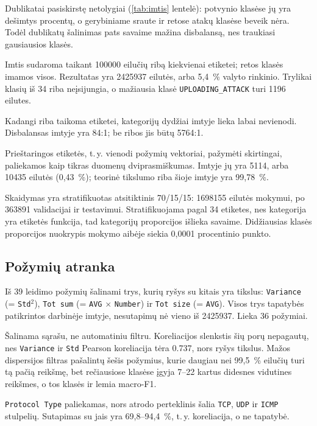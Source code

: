 Dublikatai pasiskirstę netolygiai (\ref{tab:imtis} lentelė): potvynio
klasėse jų yra dešimtys procentų, o gerybiniame sraute ir retose atakų
klasėse beveik nėra. Todėl dublikatų šalinimas pats savaime mažina
disbalansą, nes traukiasi gausiausios klasės.

Imtis sudaroma taikant \num{100000} eilučių ribą kiekvienai etiketei;
retos klasės imamos visos. Rezultatas yra \num{2425937} eilutės, arba
5,4~\% valyto rinkinio. Trylikai klasių iš 34 riba neįsijungia, o
mažiausia klasė \texttt{UPLOADING\_ATTACK} turi \num{1196} eilutes.

Kadangi riba taikoma etiketei, kategorijų dydžiai imtyje lieka labai
nevienodi. Disbalansas imtyje yra 84:1; be ribos jis būtų 5764:1.

Prieštaringos etiketės, t.\,y. vienodi požymių vektoriai, pažymėti
skirtingai, paliekamos kaip tikras duomenų dviprasmiškumas. Imtyje jų yra
\num{5114}, arba \num{10435} eilutės (0,43~\%); teorinė tikslumo riba
šioje imtyje yra 99,78~\%.

Skaidymas yra stratifikuotas atsitiktinis 70/15/15: \num{1698155}
eilutės mokymui, po \num{363891} validacijai ir testavimui.
Stratifikuojama pagal 34 etiketes, nes kategorija yra etiketės funkcija,
tad kategorijų proporcijos išlieka savaime. Didžiausias klasės
proporcijos nuokrypis mokymo aibėje siekia 0,0001 procentinio punkto.


\subsection{Požymių atranka}
\label{sec:pozymiai}

Iš 39 leidimo požymių šalinami trys, kurių ryšys su kitais yra tikslus:
\texttt{Variance} (= \texttt{Std}$^2$), \texttt{Tot sum}
(= \texttt{AVG} $\times$ \texttt{Number}) ir \texttt{Tot size}
(= \texttt{AVG}). Visos trys tapatybės
patikrintos darbinėje imtyje, nesutapimų nė vieno iš \num{2425937}.
Lieka 36 požymiai.

Šalinama sąrašu, ne automatiniu filtru. Koreliacijos slenkstis šių porų
nepagautų, nes \texttt{Variance} ir \texttt{Std} Pearson koreliacija
tėra \num{0.737}, nors ryšys tikslus. Mažos dispersijos filtras
pašalintų šešis požymius, kurie daugiau nei 99,5~\% eilučių turi tą
pačią reikšmę, bet rečiausiose klasėse įgyja 7--22 kartus didesnes
vidutines reikšmes, o tos klasės ir lemia macro-F1.

\texttt{Protocol Type} paliekamas, nors atrodo perteklinis šalia
\texttt{TCP}, \texttt{UDP} ir \texttt{ICMP} stulpelių. Sutapimas su
jais yra 69,8--94,4~\%, t.\,y. koreliacija, o ne tapatybė.

